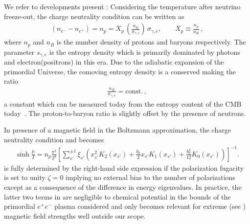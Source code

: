 \noindent We refer to developments present : Considering the temperature after neutrino freeze-out, the charge neutrality condition can be written as
\begin{align}
 \label{density_proton}
 \left(n_{e^{-}}-n_{e^{+}}\right)=n_{p}=X_p\,\left(\frac{n_{B}}{\sigma_{\gamma,e}}\right)\,\sigma_{\gamma,e},\qquad X_p\equiv\frac{n_p}{n_B}\,,
\end{align}
where $n_{p}$ and $n_B$ is the number density of protons and baryons respectively. The parameter $s_{\gamma,e}$ is the entropy density which is primarily dominated by photons and electron(positrons) in this era. Due to the adiabatic expansion of the primordial Universe, the comoving entropy density is a conserved making the ratio
\begin{align}
 \frac{n_{B}}{\sigma_{\gamma,e}} = \mathrm{const.}\,,
\end{align}
a constant which can be measured today from the entropy content of the CMB today~\cite{Fromerth:2012fe}. The proton-to-baryon ratio is slightly offset by the presence of neutrons.

In presence of a magnetic field in the Boltzmann approximation, the charge neutrality condition  and  becomes
\begin{gather}
 \label{chem}
 \sinh\frac{\mu}{T}=n_{p}\frac{\pi^{2}}{T^{3}}
 \left[\sum_{s'}^{\pm1}\xi_{s'}\!\left(\!x_{s'}^{2}K_{2}(x_{s'})\!+\!\frac{b_{0}}{2}x_{s'}K_{1}(x_{s'})\!+\!\frac{b_{0}^{2}}{12}K_{0}(x_{s'}\!)\!\right)\!\right]^{-1}\!.
\end{gather}
 is fully determined by the right-hand side expression if the polarization fugacity is set to unity $\zeta=0$ implying no external bias to the number of polarizations except as a consequence of the difference in energy eigenvalues. In practice, the latter two terms in  are negligible to chemical potential in the bounds of the primordial $e^{+}e^{-}$ plasma considered and only becomes relevant for extreme (see ) magnetic field strengths well outside our scope.

